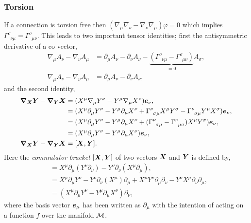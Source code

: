 \subsubsection{Torsion}
If a connection is torsion free then $(\nabla_\mu \nabla_\nu  - \nabla_\nu \nabla_\mu )\varphi=0$ which implies $\Gamma^{\sigma}_{\,\,\,\nu\mu}  = \Gamma^{\sigma}_{\,\,\,\mu\nu}$. This leads to two important tensor identities; first the antisymmetric derivative of a co-vector,
\begin{align} 
\nabla_\mu A_\nu - \nabla_\nu A_\mu &= \partial_\mu A_\nu - \partial_\nu A_\nu - \underbrace{(\Gamma^\sigma_{\,\,\,\nu\mu}- \Gamma^\sigma_{\,\,\,\mu\nu})}_{=0}A_\sigma, \\[-9pt]
\nabla_\mu A_\nu - \nabla_\nu A_\mu &= \partial_\mu A_\nu - \partial_\nu A_\nu, 
\end{align}
and the second identity,
\begin{align} 
\boldsymbol{\nabla}_{\boldsymbol{X}} \boldsymbol{Y} - \boldsymbol{\nabla}_{\boldsymbol{Y}}\boldsymbol{X} &= (X^\mu \nabla_\mu Y^\nu - Y^\mu \nabla_\mu X^\nu ) \boldsymbol{e}_\nu, \\
&= (X^\mu \partial_\mu Y^\nu - Y^\mu \partial_\mu X^\nu  + \Gamma^\nu_{\,\,\,\sigma\mu} X^\mu Y^\sigma - \Gamma^\nu_{\,\,\,\sigma\mu} Y^\mu X^\sigma) \boldsymbol{e}_\nu, \\ 
&= (X^\mu \partial_\mu Y^\nu - Y^\mu \partial_\mu X^\nu  + (\Gamma^\nu_{\,\,\,\sigma\mu}  - \Gamma^\nu_{\,\,\,\mu\sigma}) X^\mu Y^\sigma) \boldsymbol{e}_\nu, \\ 
&= (X^\mu \partial_\mu Y^\nu - Y^\mu \partial_\mu X^\nu  ) \boldsymbol{e}_\nu, \\ \boldsymbol{\nabla}_{\boldsymbol{X}} \boldsymbol{Y} - \boldsymbol{\nabla}_{\boldsymbol{Y}}\boldsymbol{X}&= [\boldsymbol{X},\boldsymbol{Y}]. 
\end{align}
Here the {\it commutator bracket} $[\boldsymbol{X},\boldsymbol{Y}]$ of two vectors $\boldsymbol{X}$ and $\boldsymbol{Y}$ is defined by, 
\begin{align}
[X^\mu \partial_\mu,Y^\nu \partial_\nu] &= X^\mu \partial_\mu (Y^\nu \partial_\nu) - Y^\nu \partial_\nu (X^\mu \partial_\mu) ,\\
&= X^\mu \partial_\mu Y^\nu  - Y^\nu \partial_\nu (X^\mu ) \partial_\mu + X^\mu Y^\nu \partial_\mu  \partial_\nu - Y^\nu X^\mu\partial_\nu  \partial_\mu ,\\
&= (X^\mu \partial_\mu Y^\nu  - Y^\mu \partial_\mu X^\nu ) \partial_\nu ,
\end{align}
where the basis vector $\boldsymbol{e}_\mu$ has been written as $\partial_\mu$ with the intention of acting on a function $f$ over the manifold $\mathcal{M}$.

